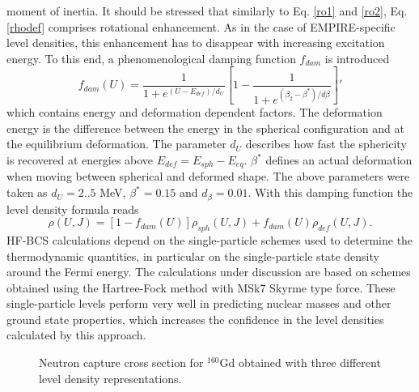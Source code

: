 \documentclass[twocolumn,amsmath,amssymb,10pt,groupedaddress,a4paper]{revtex4}
\begin{document}
moment of inertia. It should be stressed that similarly to Eq. \ref{ro1}
and \ref{ro2}, Eq. \ref{rhodef} comprises rotational enhancement.
As in the case of EMPIRE-specific level densities,
this enhancement has to disappear with increasing excitation energy.
To this end, a phenomenological damping function $f_{dam}$ is introduced
\begin{equation}
f_{dam}(U)=\frac{1}{1+e^{(U-E_{def})/d_{U}}}\left[1-\frac{1}{1+e^{(\beta_{2}-\beta^{*})/d\beta}}\right]'
\label{dampgor}
\end{equation}
 which contains energy and deformation dependent factors. The deformation
energy is the difference between the energy in the spherical configuration
and at the equilibrium deformation. The parameter $d_{U}$ describes
how fast the sphericity is recovered at energies above $E_{def}=E_{sph}-E_{eq}$.
$\beta^{*}$ defines an actual deformation when moving between spherical
and deformed shape. The above parameters were taken as $d_{U}=2..5$
MeV, $\beta^{*}=0.15$ and $d_{\beta}=0.01$. With this damping function
the level density formula reads
\begin{equation}
\rho(U,J)=\left[1-f_{dam}(U)\right]\rho_{sph}(U,J)+f_{dam}(U)\rho_{def}(U,J).
\label{rogor}
\end{equation}
HF-BCS calculations depend on the single-particle schemes
used to determine the thermodynamic quantities, in particular on the
single-particle state density around the Fermi energy. The calculations
under discussion are based on schemes obtained using the Hartree-Fock
method with MSk7 Skyrme type force. These single-particle levels perform
very well in predicting nuclear masses and other ground state properties,
which increases the confidence in the level densities
calculated by this approach.
\begin{figure}[htbp]
\caption{Neutron capture cross section for $^{160}$Gd obtained with three different
level density representations.}
\label{levdens}
\end{figure}
\end{document}
